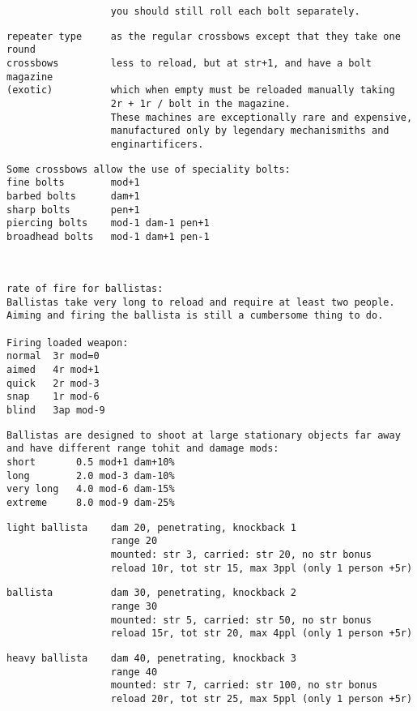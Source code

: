 \begin{samepage}
\begin{verbatim}
                  you should still roll each bolt separately.
\end{verbatim} \blocklistgap \begin{verbatim}
repeater type     as the regular crossbows except that they take one round
crossbows         less to reload, but at str+1, and have a bolt magazine
(exotic)          which when empty must be reloaded manually taking
                  2r + 1r / bolt in the magazine.
                  These machines are exceptionally rare and expensive,
                  manufactured only by legendary mechanismiths and
                  enginartificers.
\end{verbatim} \blocklistgap \begin{verbatim}
Some crossbows allow the use of speciality bolts:
fine bolts        mod+1
barbed bolts      dam+1
sharp bolts       pen+1
piercing bolts    mod-1 dam-1 pen+1
broadhead bolts   mod-1 dam+1 pen-1
\end{verbatim} \end{samepage} \normalsize \goodbreak

\

\goodbreak \small \begin{samepage} \begin{verbatim}
rate of fire for ballistas:
Ballistas take very long to reload and require at least two people.
Aiming and firing the ballista is still a cumbersome thing to do.

Firing loaded weapon:
normal  3r mod=0
aimed   4r mod+1
quick   2r mod-3
snap    1r mod-6
blind   3ap mod-9
\end{verbatim} \blocklistgap \begin{verbatim}
Ballistas are designed to shoot at large stationary objects far away
and have different range tohit and damage mods:
short       0.5 mod+1 dam+10%
long        2.0 mod-3 dam-10%
very long   4.0 mod-6 dam-15%
extreme     8.0 mod-9 dam-25%
\end{verbatim} \blocklistgap \begin{verbatim}
light ballista    dam 20, penetrating, knockback 1
                  range 20
                  mounted: str 3, carried: str 20, no str bonus
                  reload 10r, tot str 15, max 3ppl (only 1 person +5r)
\end{verbatim} \blocklistgap \begin{verbatim}
ballista          dam 30, penetrating, knockback 2
                  range 30
                  mounted: str 5, carried: str 50, no str bonus
                  reload 15r, tot str 20, max 4ppl (only 1 person +5r)
\end{verbatim} \blocklistgap \begin{verbatim}
heavy ballista    dam 40, penetrating, knockback 3
                  range 40
                  mounted: str 7, carried: str 100, no str bonus
                  reload 20r, tot str 25, max 5ppl (only 1 person +5r)
\end{verbatim} \end{samepage} \normalsize \goodbreak

